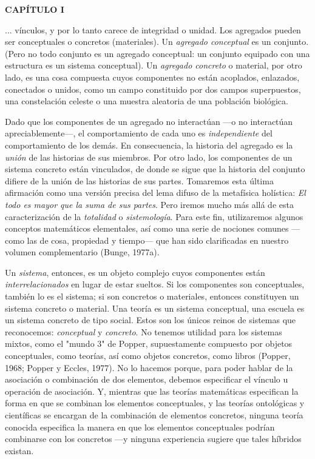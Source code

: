 \newpage

\fancyhf{}
\fancyhead[l]{\thepage} 
\begin{center}
{\fontsize{13}{16}\selectfont \textbf{CAPÍTULO I}}
\end{center}

\vspace{0cm}

{\fontsize{13}{15}\selectfont
... vínculos, y por lo tanto carece de integridad o unidad. Los agregados pueden ser conceptuales o concretos (materiales). Un \textit{agregado conceptual} es un conjunto. (Pero no todo conjunto es un agregado conceptual: un conjunto equipado con una estructura es un sistema conceptual). Un \textit{agregado concreto} o material, por otro lado, es una cosa compuesta cuyos componentes no están acoplados, enlazados, conectados o unidos, como un campo constituido por dos campos superpuestos, una constelación celeste o una muestra aleatoria de una población biológica.

Dado que los componentes de un agregado no interactúan —o no interactúan apreciablemente—, el comportamiento de cada uno es \textit{independiente} del comportamiento de los demás. En consecuencia, la historia del agregado es la \textit{unión} de las historias de sus miembros. Por otro lado, los componentes de un sistema concreto están vinculados, de donde se sigue que la historia del conjunto difiere de la unión de las historias de sus partes. Tomaremos esta última afirmación como una versión precisa del lema difuso de la metafísica holística: \textit{El todo es mayor que la suma de sus partes}. Pero iremos mucho más allá de esta caracterización de la \textit{totalidad} o \textit{sistemología}. Para este fin, utilizaremos algunos conceptos matemáticos elementales, así como una serie de nociones comunes —como las de cosa, propiedad y tiempo— que han sido clarificadas en nuestro volumen complementario (Bunge, 1977a).

Un \textit{sistema}, entonces, es un objeto complejo cuyos componentes están \textit{interrelacionados} en lugar de estar sueltos. Si los componentes son conceptuales, también lo es el sistema; si son concretos o materiales, entonces constituyen un sistema concreto o material. Una teoría es un sistema conceptual, una escuela es un sistema concreto de tipo social. Estos son los únicos reinos de sistemas que reconocemos: \textit{conceptual} y \textit{concreto}. No tenemos utilidad para los sistemas mixtos, como el "mundo 3" de Popper, supuestamente compuesto por objetos conceptuales, como teorías, así como objetos concretos, como libros (Popper, 1968; Popper y Eccles, 1977). No lo hacemos porque, para poder hablar de la asociación o combinación de dos elementos, debemos especificar el vínculo u operación de asociación. Y, mientras que las teorías matemáticas especifican la forma en que se combinan los elementos conceptuales, y las teorías ontológicas y científicas se encargan de la combinación de elementos concretos, ninguna teoría conocida especifica la manera en que los elementos conceptuales podrían combinarse con los concretos —y ninguna experiencia sugiere que tales híbridos existan.

}
